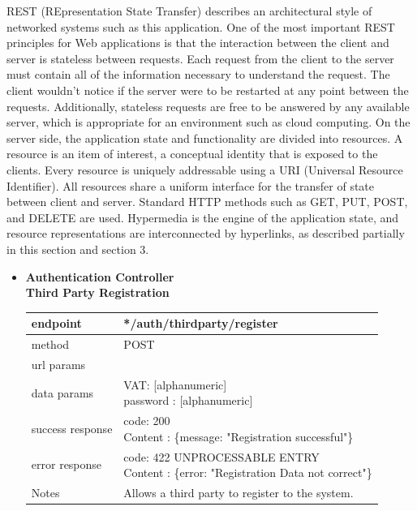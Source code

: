 \begin{legal}
\begin{legal}
				REST (REpresentation State Transfer) describes an architectural style of networked systems such as this application. One of the most important REST principles for Web applications is that the interaction between the client and server is stateless between requests. Each request from the client to the server must contain all of the information necessary to understand the request. The client wouldn't notice if the server were to be restarted at any point between the requests. Additionally, stateless requests are free to be answered by any available server, which is appropriate for an environment such as cloud computing. On the server side, the application state and functionality are divided into resources. A resource is an item of interest, a conceptual identity that is exposed to the clients. Every resource is uniquely addressable using a URI (Universal Resource Identifier). All resources share a uniform interface for the transfer of state between client and server. Standard HTTP methods such as GET, PUT, POST, and DELETE are used. Hypermedia is the engine of the application state, and resource representations are interconnected by hyperlinks, as described partially in this section and section 3.

					\begin{itemize}
						\item \textbf{Authentication Controller} \\
				
						\textbf{Third Party Registration} \\
			
							\begin{tabularx}{\linewidth}{| l | l |}
								\hline
								endpoint & */auth/thirdparty/register \\
								\hline
								method & POST \\
								\hline
								url params & \\
								\hline
								data params &
								\parbox{0.7\textwidth}{
									\bigskip
									VAT: [alphanumeric]\\
									password : [alphanumeric]\\
									\bigskip
								} \\
								\hline
								success response &
								\parbox{0.7\textwidth}{
									\bigskip
									code: 200\\
									Content : \{message: "Registration successful"\}
									\bigskip
								} \\
								\hline
								error response &
								\parbox{0.7\textwidth}{
									\bigskip
									code: 422 UNPROCESSABLE ENTRY \\
									Content : \{error: "Registration Data not correct"\}
									\bigskip
								} \\
								\hline
								Notes & 
								\parbox{0.7\textwidth}{
									\bigskip Allows a third party to register to the system.
								\bigskip}  \\
								\hline
							\end{tabularx}\\
					

\end{itemize}
\end{legal}
\end{legal}
